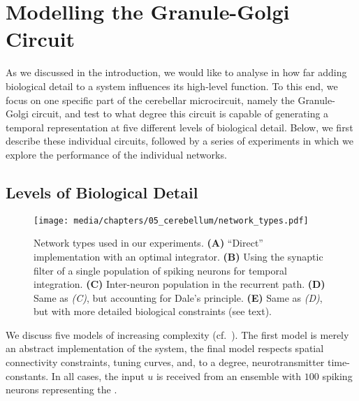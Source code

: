 
\section{Modelling the Granule-Golgi Circuit}
\label{sec:cerebellum_golgi_granule}

As we discussed in the introduction, we would like to analyse in how far adding biological detail to a system influences its high-level function.
To this end, we focus on one specific part of the cerebellar microcircuit, namely the Granule-Golgi circuit, and test to what degree this circuit is capable of generating a temporal representation at five different levels of biological detail.
Below, we first describe these individual circuits, followed by a series of experiments in which we explore the performance of the individual networks.

\subsection{Levels of Biological Detail}
\label{sec:cerebellum_levels}

\begin{figure}
	\centering
	\texttt{[image: media/chapters/05\_cerebellum/network\_types.pdf]}%
	{\label{fig:cerebellum_network_types_a}}%
	{\label{fig:cerebellum_network_types_b}}%
	{\label{fig:cerebellum_network_types_c}}%
	{\label{fig:cerebellum_network_types_d}}%
	{\label{fig:cerebellum_network_types_e}}%
	\caption[Network types used in the cerebellum experiments.]{Network types used in our experiments. \textbf{(A)} \enquote{Direct} implementation with an optimal integrator. \textbf{(B)} Using the synaptic filter of a single population of spiking neurons for temporal integration. \textbf{(C)} Inter-neuron population in the recurrent path. \textbf{(D)} Same as \emph{(C)}, but accounting for Dale's principle. \textbf{(E)} Same as \emph{(D)}, but with more detailed biological constraints (see text).}
	\label{fig:cerebellum_network_types}
\end{figure}

We discuss five models of increasing complexity (cf.~).
The first model is merely an abstract implementation of the \LDN system, the final model respects spatial connectivity constraints, tuning curves, and, to a degree, neurotransmitter time-constants.
In all cases, the input $u$ is received from an \NEF ensemble with $100$ spiking \LIF neurons representing the \PCN.

